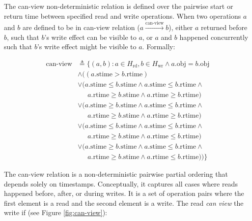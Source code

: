 The can-view non-deterministic relation is defined over the pairwise
start or return time between
specified read and write operations. When two operations $a$ and $b$
are defined to be in can-view relation ($a \xrightarrow{\text{can-view}} b$),
either $a$ returned before $b$, such that $b$'s write effect can be
visible to $a$, or $a$ and $b$ happened concurrently such that
$b$'s write effect might be visible to $a$. Formally:

\begin{align*}
  \text{can-view} &\triangleq \{(a, b) : a \in H_\text{rd}, b \in
    H_\text{wr} \land a.\text{obj} = b.\text{obj} \\
    &\land ((
      a.\text{stime} > b.\text{rtime}) \\
      &\lor
      (a.\text{stime} \leq b.\text{stime} \land
        a.\text{stime} \leq b.\text{rtime} \land \\
        &\quad\ \ a.\text{rtime} \geq b.\text{stime} \land
      a.\text{rtime} \geq b.\text{rtime}) \\
      &\lor
      (a.\text{stime} \geq b.\text{stime} \land
        a.\text{stime} \leq b.\text{rtime} \land \\
        &\quad\ \ a.\text{rtime} \geq b.\text{stime} \land
      a.\text{rtime} \geq b.\text{rtime}) \\
      &\lor
      (a.\text{stime} \leq b.\text{stime} \land
        a.\text{stime} \leq b.\text{rtime} \land \\
        &\quad\ \ a.\text{rtime} \geq b.\text{stime} \land
      a.\text{rtime} \leq b.\text{rtime}) \\
      &\lor
      (a.\text{stime} \geq b.\text{stime} \land
        a.\text{stime} \leq b.\text{rtime} \land \\
        &\quad\ \ a.\text{rtime} \geq b.\text{stime} \land
        a.\text{rtime} \leq b.\text{rtime}
      )
  )\}
\end{align*}

The can-view relation is a non-deterministic pairwise
partial ordering that depends solely on timestamps. Conceptually, it captures
all cases where reads happened before, after, or during writes.
It is a set
of operation pairs where the first element is a read and the second
element is a write. The read \textit{can view} the write if (see
Figure \ref{fig:can-view}):

